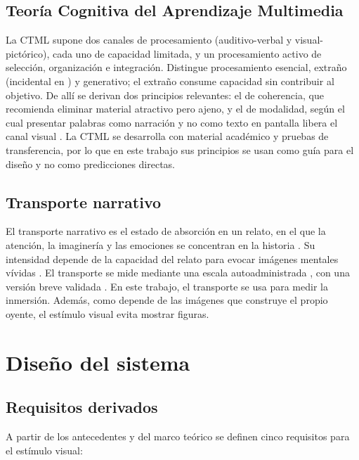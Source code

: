 \documentclass[journal]{IEEEtran}
\begin{document}
\subsection{Teoría Cognitiva del Aprendizaje Multimedia}
La CTML \cite{mayer2009, mayer2024} supone dos canales de procesamiento (auditivo-verbal y visual-pictórico), cada uno de capacidad limitada, y un procesamiento activo de selección, organización e integración. Distingue procesamiento esencial, extraño (incidental en \cite{mayermoreno2003}) y generativo; el extraño consume capacidad sin contribuir al objetivo. De allí se derivan dos principios relevantes: el de coherencia, que recomienda eliminar material atractivo pero ajeno, y el de modalidad, según el cual presentar palabras como narración y no como texto en pantalla libera el canal visual \cite{mayermoreno2003, mousavi1995}. La CTML se desarrolla con material académico y pruebas de transferencia, por lo que en este trabajo sus principios se usan como guía para el diseño y no como predicciones directas.
 
\subsection{Transporte narrativo}
El transporte narrativo es el estado de absorción en un relato, en el que la atención, la imaginería y las emociones se concentran en la historia \cite{greenbrock2000}. Su intensidad depende de la capacidad del relato para evocar imágenes mentales vívidas \cite{greenbrock2002}. El transporte se mide mediante una escala autoadministrada \cite{greenbrock2000}, con una versión breve validada \cite{appel2015}. En este trabajo, el transporte se usa para medir la inmersión. Además, como depende de las imágenes que construye el propio oyente, el estímulo visual evita mostrar figuras.
 
\section{Diseño del sistema}
 
\subsection{Requisitos derivados}
A partir de los antecedentes y del marco teórico se definen cinco requisitos para el estímulo visual:
 
\end{document}

